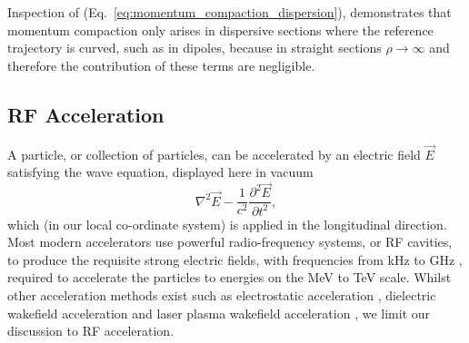 \documentclass[../main.tex]{subfiles}
\begin{document}
Inspection of (Eq.~\ref{eq:momentum_compaction_dispersion}), demonstrates that momentum compaction only arises in dispersive sections where the reference trajectory is curved, such as in dipoles, because in straight sections $\rho\rightarrow\infty$ and therefore the contribution of these terms are negligible. 

\subsection{RF Acceleration}
\label{sec:RF_acceleration}

A particle, or collection of particles, can be accelerated by an electric field $\overrightarrow{E}$ satisfying the wave equation, displayed here in vacuum
\begin{equation}
\nabla^{2}\overrightarrow{E}-\frac{1}{c^{2}}\frac{\partial^{2}\overrightarrow{E}}{\partial t^{2}},
\label{eq:electromagnetic_wave_equation}    
\end{equation}
which (in our local co-ordinate system) is applied in the longitudinal direction. Most modern accelerators use powerful radio-frequency systems, or RF cavities, to produce the requisite strong electric fields, with frequencies from \si{\kilo\hertz} to \si{\giga\hertz} \cite{wille2000physics}, required to accelerate the particles to energies on the \si{\mega\electronvolt} to \si{\tera\electronvolt} scale. Whilst other acceleration methods exist such as electrostatic acceleration \cite{bromley1974development}, dielectric wakefield acceleration \cite{mtingwa1990theory} and laser plasma wakefield acceleration \cite{sprangle1988laser}, we limit our discussion to RF acceleration.
\end{document}

